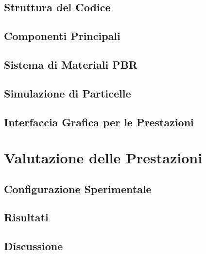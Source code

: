 \documentclass[12pt,a4paper,openright,twoside]{book}
\begin{document}
\section{Struttura del Codice}

\section{Componenti Principali}

\section{Sistema di Materiali PBR}

\section{Simulazione di Particelle}

\section{Interfaccia Grafica per le Prestazioni}

\chapter{Valutazione delle Prestazioni}
\label{chap:valutazione}

\section{Configurazione Sperimentale}

\section{Risultati}

\section{Discussione}

\label{chap:conclusioni}
\end{document}
